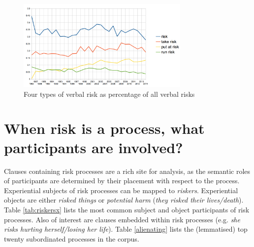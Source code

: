 			\begin{figure}[htb!]
			\centering
			\includegraphics[width=0.75\textwidth]{../images/verbalrisks.png}
			\caption{Four types of verbal risk as percentage of all verbal risks}
			\label{fig:verbalrisks}
			\end{figure}

		
		\section{When risk is a process, what participants are involved?}
		\FloatBarrier
		
		Clauses containing risk processes are a rich site for analysis, as the semantic roles of participants are determined by their placement with respect to the process. Experiential subjects of risk processes can be mapped to \emph{riskers}. Experiential objects are either \emph{risked things} or \emph{potential harm} (\emph{they risked their lives/death}). Table \ref{tab:riskersx} lists the most common subject and object participants of risk processes. Also of interest are clauses embedded within risk processes (e.g. \emph{she risks hurting herself/losing her life}). Table \ref{alienating} lists the (lemmatised) top twenty subordinated processes in the corpus.

